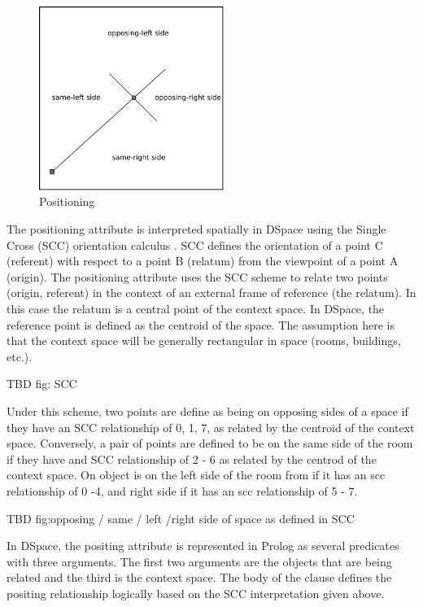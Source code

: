 \documentclass[12pt]{ucthesis}
\begin{document}
\begin{figure}[H]
\centering
\includegraphics[width=60mm]{position}
\caption{Positioning}
\label{position}
\end{figure}

The positioning attribute is interpreted spatially in DSpace using the Single Cross (SCC) orientation calculus \cite{Freksa}. SCC defines the orientation of a point C (referent) with respect to a point B (relatum) from the viewpoint of a point A (origin). The positioning attribute uses the SCC scheme to relate two points (origin, referent) in the context of an external frame of reference (the relatum). In this case the relatum is a central point of the context space. In DSpace, the reference point is defined as the centroid of the space. The assumption here is that the context space will be generally rectangular in space (rooms, buildings, etc.).

TBD fig: SCC

Under this scheme, two points are define as being on opposing sides of a space if they have an SCC relationship of 0, 1, 7, as related by the centroid of the context space. Conversely, a pair of points are defined to be on the same side of the room if they have and SCC relationship of 2 - 6 as related by the centrod of the context space. On object is on the left side of the room from if it has an scc relationship of 0 -4, and right side if it has an scc relationship of 5 - 7. 

TBD fig:opposing / same / left /right side of space as defined in SCC

In DSpace, the positing attribute is represented in Prolog as several predicates with three arguments. The first two arguments are the objects that are being related and the third is the context space. The body of the clause defines the positing relationship logically based on the SCC interpretation given above.
\end{document}
